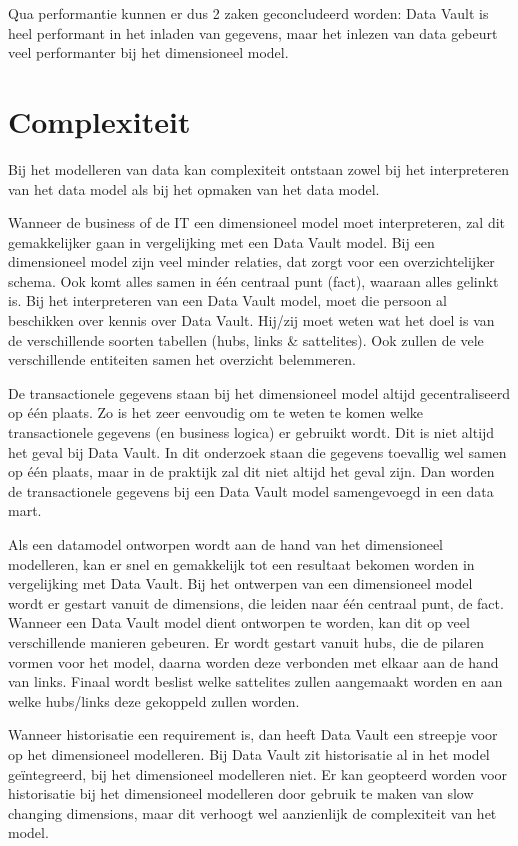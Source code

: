 Qua performantie kunnen er dus 2 zaken geconcludeerd worden: Data Vault is heel performant in het inladen van gegevens, maar het inlezen van data gebeurt veel performanter bij het dimensioneel model.

\section{Complexiteit}
Bij het modelleren van data kan complexiteit ontstaan zowel bij het interpreteren van het data model als bij het opmaken van het data model. 

Wanneer de business of de IT een dimensioneel model moet interpreteren, zal dit gemakkelijker gaan in vergelijking met een Data Vault model. Bij een dimensioneel model zijn veel minder relaties, dat zorgt voor een overzichtelijker schema. Ook komt alles samen in één centraal punt (fact), waaraan alles gelinkt is. Bij het interpreteren van een Data Vault model, moet die persoon al beschikken over kennis over Data Vault. Hij/zij moet weten wat het doel is van de verschillende soorten tabellen (hubs, links \& sattelites). Ook zullen de vele verschillende entiteiten samen het overzicht belemmeren. 

De transactionele gegevens staan bij het dimensioneel model altijd gecentraliseerd op één plaats. Zo is het zeer eenvoudig om te weten te komen welke transactionele gegevens (en business logica) er gebruikt wordt. Dit is niet altijd het geval bij Data Vault. In dit onderzoek staan die gegevens toevallig wel samen op één plaats, maar in de praktijk zal dit niet altijd het geval zijn. Dan worden de transactionele gegevens bij een Data Vault model samengevoegd in een data mart.

Als een datamodel ontworpen wordt aan de hand van het dimensioneel modelleren, kan er snel en gemakkelijk tot een resultaat bekomen worden in vergelijking met Data Vault. Bij het ontwerpen van een dimensioneel model wordt er gestart vanuit de dimensions, die leiden naar één centraal punt, de fact. Wanneer een Data Vault model dient ontworpen te worden, kan dit op veel verschillende manieren gebeuren. Er wordt gestart vanuit hubs, die de pilaren vormen voor het model, daarna worden deze verbonden met elkaar aan de hand van links. Finaal wordt beslist welke sattelites zullen aangemaakt worden en aan welke hubs/links deze gekoppeld zullen worden.

Wanneer historisatie een requirement is, dan heeft Data Vault een streepje voor op het dimensioneel modelleren. Bij Data Vault zit historisatie al in het model geïntegreerd, bij het dimensioneel modelleren niet. Er kan geopteerd worden voor historisatie bij het dimensioneel modelleren door gebruik te maken van slow changing dimensions, maar dit verhoogt wel aanzienlijk de complexiteit van het model.

